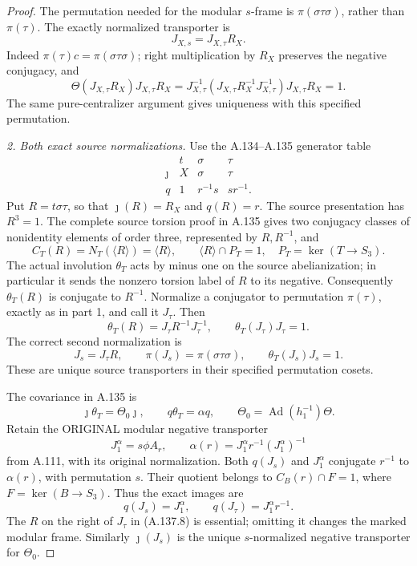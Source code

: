 \begin{proof}
The permutation needed for the modular \(s\)-frame is
\(\pi(\sigma\tau\sigma)\), rather than \(\pi(\tau)\).
The exactly normalized transporter is
\[
 J_{X,s}=J_{X,\tau}R_X .
\tag{A.137.5}
\]
Indeed \(\pi(\tau)c=\pi(\sigma\tau\sigma)\); right multiplication
by \(R_X\) preserves the negative conjugacy, and
\[
 \Theta(J_{X,\tau}R_X)J_{X,\tau}R_X
 =J_{X,\tau}^{-1}
   (J_{X,\tau}R_X^{-1}J_{X,\tau}^{-1})
   J_{X,\tau}R_X=1.
\]
The same pure-centralizer argument gives uniqueness with this
specified permutation.

\par\smallskip\noindent
\emph{2. Both exact source normalizations.}
Use the A.134--A.135 generator table
\[
\begin{array}{c|ccc}
 &t&\sigma&\tau\\\hline
 \jmath&X&\sigma&\tau\\
 q&1&r^{-1}s&sr^{-1}.
\end{array}
\tag{A.137.6}
\]
Put \(R=t\sigma\tau\), so that \(\jmath(R)=R_X\) and
\(q(R)=r\). The source presentation has \(R^3=1\).
The complete source torsion proof in A.135 gives two conjugacy
classes of nonidentity elements of order three, represented
by \(R,R^{-1}\), and
\[
 C_T(R)=N_T(\langle R\rangle)=\langle R\rangle,
 \qquad \langle R\rangle\cap P_T=1,
 \quad P_T=\ker(T\to S_3).
\tag{A.137.7}
\]
The actual involution \(\theta_T\) acts by minus one on the
source abelianization; in particular it sends the nonzero
torsion label of \(R\) to its negative. Consequently
\(\theta_T(R)\) is conjugate to \(R^{-1}\).
Normalize a conjugator to permutation \(\pi(\tau)\), exactly
as in part 1, and call it \(J_\tau\). Then
\[
 \theta_T(R)=J_\tau R^{-1}J_\tau^{-1},\qquad
 \theta_T(J_\tau)J_\tau=1.
\]
The correct second normalization is
\[
 J_s=J_\tau R,\qquad
 \pi(J_s)=\pi(\sigma\tau\sigma),\qquad
 \theta_T(J_s)J_s=1 .
\tag{A.137.8}
\]
These are unique source transporters in their specified
permutation cosets.

The covariance in A.135 is
\[
 \jmath\theta_T=\Theta_0\jmath,\qquad
 q\theta_T=\alpha q,\qquad
 \Theta_0=\operatorname{Ad}(h_1^{-1})\Theta .
\]
Retain the ORIGINAL modular negative transporter
\[
 J_1^\alpha=s\phi A_r,\qquad
 \alpha(r)=J_1^\alpha r^{-1}(J_1^\alpha)^{-1}
\tag{A.137.9}
\]
from A.111, with its original normalization.
Both \(q(J_s)\) and \(J_1^\alpha\) conjugate \(r^{-1}\)
to \(\alpha(r)\), with permutation \(s\).
Their quotient belongs to \(C_B(r)\cap F=1\), where
\(F=\ker(B\to S_3)\). Thus the exact images are
\[
 q(J_s)=J_1^\alpha,\qquad
 q(J_\tau)=J_1^\alpha r^{-1}.
\tag{A.137.10}
\]
The \(R\) on the right of \(J_\tau\) in (A.137.8) is
essential; omitting it changes the marked modular frame.
Similarly \(\jmath(J_s)\) is the unique \(s\)-normalized
negative transporter for \(\Theta_0\).


\end{proof}
